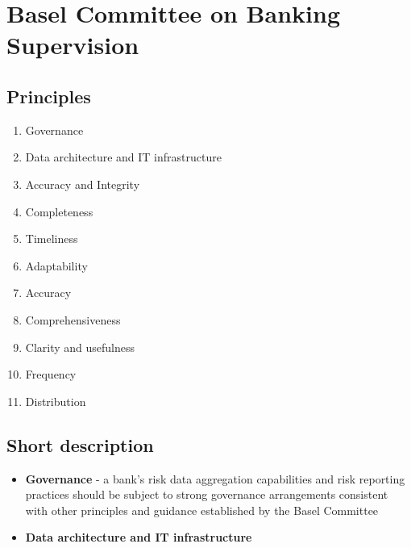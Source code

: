 \chapter{Basel Committee on Banking Supervision}

\section{Principles}

\begin{enumerate}
	\item Governance
	\item Data architecture and IT infrastructure
	\item Accuracy and Integrity
	\item Completeness
	\item Timeliness
	\item Adaptability
	\item Accuracy
	\item Comprehensiveness
	\item Clarity and usefulness
	\item Frequency
	\item Distribution
\end{enumerate}

\section{Short description}

\begin{itemize}
	\item \textbf{\color{blue}Governance} - a bank's risk data aggregation capabilities and risk reporting practices should be subject to strong governance arrangements consistent with other principles and guidance established by the Basel Committee
	\item \textbf{\color{blue}Data architecture and IT infrastructure} 
\end{itemize}
